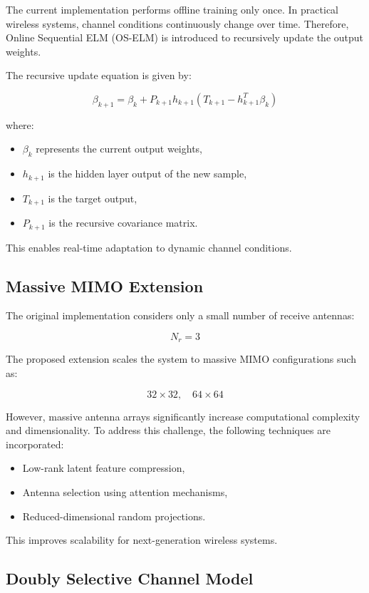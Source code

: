 \documentclass[10pt, conference]{IEEEtran}
\begin{document}
The current implementation performs offline training only once. In practical wireless systems, channel conditions continuously change over time. Therefore, Online Sequential ELM (OS-ELM) is introduced to recursively update the output weights.

The recursive update equation is given by:

\[
\beta_{k+1}
=
\beta_k
+
P_{k+1} h_{k+1}
\left(
T_{k+1}
-
h_{k+1}^T \beta_k
\right)
\]

where:
\begin{itemize}
    \item $\beta_k$ represents the current output weights,
    \item $h_{k+1}$ is the hidden layer output of the new sample,
    \item $T_{k+1}$ is the target output,
    \item $P_{k+1}$ is the recursive covariance matrix.
\end{itemize}

This enables real-time adaptation to dynamic channel conditions.

\subsection{Massive MIMO Extension}

The original implementation considers only a small number of receive antennas:

\[
N_r = 3
\]

The proposed extension scales the system to massive MIMO configurations such as:

\[
32 \times 32, \quad 64 \times 64
\]

However, massive antenna arrays significantly increase computational complexity and dimensionality. To address this challenge, the following techniques are incorporated:

\begin{itemize}
    \item Low-rank latent feature compression,
    \item Antenna selection using attention mechanisms,
    \item Reduced-dimensional random projections.
\end{itemize}

This improves scalability for next-generation wireless systems.

\subsection{Doubly Selective Channel Model}
\end{document}
